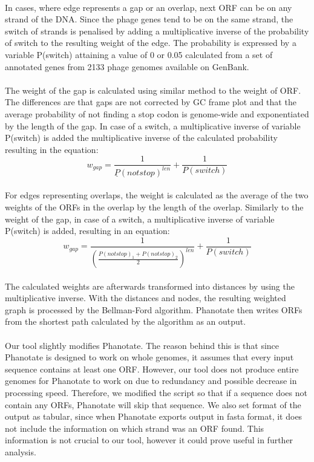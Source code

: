 \paragraph*{}
In cases, where edge represents a gap or an overlap, next ORF can be on any strand of the DNA. Since the phage genes tend to be on the same strand, the switch of strands is penalised by adding a multiplicative inverse of the probability of switch to the resulting weight of the edge. The probability is expressed by a variable P(switch) attaining a value of 0 or 0.05 calculated from a set of annotated genes from 2133 phage genomes available on GenBank.
\paragraph*{}
The weight of the gap is calculated using similar method to the weight of ORF. The differences are that gaps are not corrected by GC frame plot and that the average probability of not finding a stop codon is genome-wide and exponentiated by the length of the gap. In case of a switch, a multiplicative inverse of variable P(switch) is added the multiplicative inverse of the calculated probability resulting in the equation:
\[w_{gap} = \frac{1}{\underline{P}(not stop)^{len}} + \frac{1}{P(switch)}\]
\paragraph*{}
For edges representing overlaps, the weight is calculated as the average of the two weights of the ORFs in the overlap by the length of the overlap. Similarly to the weight of the gap, in case of a switch, a multiplicative inverse of variable P(switch) is added, resulting in an equation:
\[w_{gap} = \frac{1}{(\frac{P(not stop)_{1} + P(not stop)_{2}}{2})^{len}} + \frac{1}{P(switch)}\]
\paragraph*{}
The calculated weights are afterwards transformed into distances by using the multiplicative inverse. With the distances and nodes, the resulting weighted graph is processed by the Bellman-Ford algorithm. Phanotate then writes ORFs from the shortest path calculated by the algorithm as an output.
\paragraph*{}
Our tool slightly modifies Phanotate. The reason behind this is that since Phanotate is designed to work on whole genomes, it assumes that every input sequence contains at least one ORF. However, our tool does not produce entire genomes for Phanotate to work on due to redundancy and possible decrease in processing speed. Therefore, we modified the script so that if a sequence does not contain any ORFs, Phanotate will skip that sequence. We also set format of the output as tabular, since when Phanotate exports output in fasta format, it does not include the information on which strand was an ORF found. This information is not crucial to our tool, however it could prove useful in further analysis.

